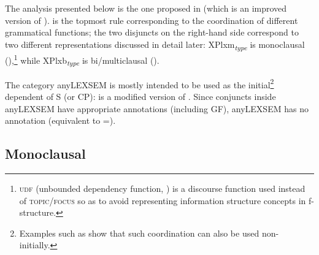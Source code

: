 \documentclass[output=paper]{../langscibook}
\begin{document}
The analysis presented below is the one proposed in \citet{Patejuk2015} (which is an improved version
of \citet{PatejukPrzepiorkowski2012}).  is the topmost rule
corresponding to the coordination of different grammatical functions;
the two disjuncts on the right-hand side correspond to two different
representations discussed in detail later:
XPlxm\textsubscript{\textit{type}} is monoclausal
(),\footnote{\textsc{udf} (unbounded dependency
  function, \citet{ash:11}) is a discourse function used instead of
  \textsc{topic}/\textsc{focus} so as to avoid
  representing information structure concepts in f-structure.} while
XPlxb\textsubscript{\textit{type}} is bi/multiclausal ().
\ea\label{ex:Patejuk2015:5.229}
\z

The category anyLEXSEM is mostly intended to be used as the
initial\footnote{Examples such as  show that such
coordination can also be used non-initially.} dependent
of S (or CP):  is a modified version of
.
Since conjuncts inside anyLEXSEM
have appropriate annotations (including GF), anyLEXSEM
has no annotation (equivalent to {\DOWN=\UP}).
\ea\label{ex:cstr:S:basic:MOD}
\z

\subsection{Monoclausal}
\label{sec:Coordination:lexsem:mono}
\end{document}
